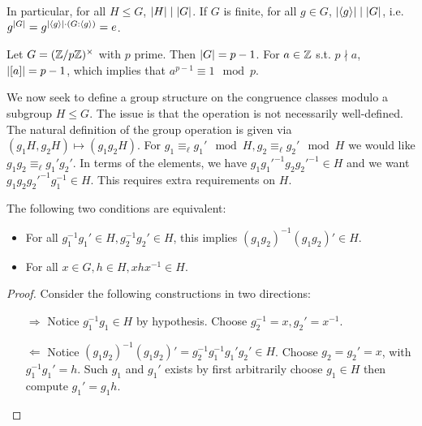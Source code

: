 \documentclass{article}
\begin{document}
\begin{corollary}
    In particular, for all $H \leq G$, $\left|H\right| \mid \left|G\right|$. If $G$ is finite, for all $g \in G$, $\left|\left\langle g \right\rangle\right| \mid \left|G\right|$, i.e. $g^{\left|G\right|} = g^{\left|\left\langle g \right\rangle\right| \cdot (G : \left\langle g \right\rangle)} = e$.
\end{corollary}

\begin{example}
    Let $G = (\mathbb{Z}/p\mathbb{Z})^{\times}$ with $p$ prime. Then $\left|G\right| = p - 1$. For $a \in \mathbb{Z}$ s.t. $p \nmid a$, $\left|[a]\right| = p-1$, which implies that $a^{p-1} \equiv 1 \mod p$. 
\end{example}

We now seek to define a group structure on the congruence classes modulo a subgroup $H \leq G$. The issue is that the operation is not necessarily well-defined. The natural definition of the group operation is given via $(g_1 H, g_2 H) \mapsto (g_1 g_2 H)$. For $g_1 \equiv_{\ell} g_1' \mod H, g_2 \equiv_{\ell} g_2' \mod H$ we would like $g_1 g_2 \equiv_{\ell} g_1' g_2'$. In terms of the elements, we have $g_1 g_1'^{-1} g_2 g_2'^{-1} \in H$ and we want $g_1 g_2 g_2'^{-1} g_1^{-1} \in H$. This requires extra requirements on $H$.

\begin{claim}
    The following two conditions are equivalent:
    \begin{itemize}
        \item For all $g_1^{-1}g_1' \in H, g_2^{-1}g_2' \in H$, this implies $(g_1 g_2)^{-1}(g_1 g_2)' \in H$.
        \item For all $x \in G, h \in H, xhx^{-1} \in H$.
    \end{itemize}
\end{claim}

\begin{proof}
    Consider the following constructions in two directions:
    \begin{itemize}
        \item[$\Rightarrow$] Notice $g_1^{-1} g_1 \in H$ by hypothesis. Choose $g_2^{-1} = x, g_2' = x^{-1}$.
        \item[$\Leftarrow$] Notice $(g_1 g_2)^{-1}(g_1 g_2)' = g_2^{-1} g_1^{-1} g_1' g_2' \in H$. Choose $g_2 = g_2' = x$, with $g_1^{-1} g_1' = h$. Such $g_1$ and $g_1'$ exists by first arbitrarily choose $g_1 \in H$ then compute $g_1' = g_1 h$.
    \end{itemize}
\end{proof}
\end{document}
